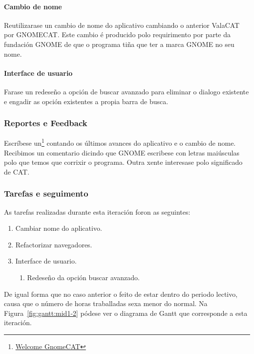 \paragraph{Cambio de nome} Reutilizarase un cambio de nome do aplicativo cambiando o anterior ValaCAT por GNOMECAT. Este cambio é producido polo requirimento por parte da fundación GNOME de que o programa tiña que ter a marca GNOME no seu nome.

\paragraph{Interface de usuario} Farase un redeseño a opción de buscar avanzado para eliminar o dialogo existente e engadir as opción existentes a propia barra de busca.

\subsubsection{Reportes e Feedback}
Escríbese un\footnote{\href{http://aquelando.info/welcome-gnomecat/}{Welcome GnomeCAT}} contando os últimos avances do aplicativo e o cambio de nome. Recibimos un comentario dicindo que GNOME escribese con letras maiúsculas polo que temos que corrixir o programa. Outra xente interesase polo significado de CAT.

\subsubsection{Tarefas e seguimento}

As tarefas realizadas durante esta iteración foron as seguintes:

\begin{enumerate}[label=\bfseries WBS 2.\arabic*]
  \item Cambiar nome do aplicativo.
  \item Refactorizar navegadores.
  \item Interface de usuario.
    \begin{enumerate}[label=\bfseries WBS 2.3.\arabic*]
      \item Redeseño da opción buscar avanzado.
    \end{enumerate}
\end{enumerate}

De igual forma que no caso anterior o feito de estar dentro do periodo lectivo, causa que o número de horas traballadas sexa menor do normal. Na Figura~\ref{fig:gantt:mid1-2} pódese ver o diagrama de Gantt que corresponde a esta iteración.

